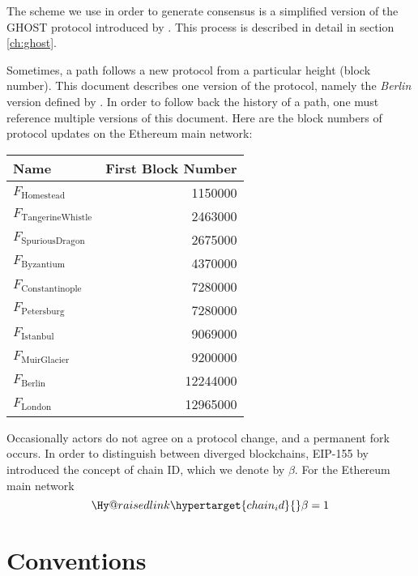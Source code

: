 \documentclass[9pt,oneside]{amsart}
\makeatletter
\newcommand{\linkdest}[1]{\Hy@raisedlink{\hypertarget{#1}{}}}
\makeatother
\begin{document}
\begin{multicols}{2}
The scheme we use in order to generate consensus is a simplified version of the GHOST protocol introduced by \cite{cryptoeprint:2013:881}. This process is described in detail in section \ref{ch:ghost}.

Sometimes, a path follows a new protocol from a particular height (block number).
This document describes one version of the protocol, namely the \textit{Berlin} version defined by \cite{BeikoBerlin}.
In order to follow back the history of a path, one must reference multiple versions of this document.
Here are the block numbers of protocol updates on the Ethereum main network:
\par
\begin{center}
\begin{tabular}{lr}
\toprule
Name & First Block Number \\
\midrule
$F_{\mathrm{Homestead}}$         &  1150000 \\
$F_{\mathrm{Tangerine Whistle}}$ &  2463000 \\
$F_{\mathrm{Spurious Dragon}}$   &  2675000 \\
$F_{\mathrm{Byzantium}}$         &  4370000 \\
$F_{\mathrm{Constantinople}}$    &  7280000 \\
$F_{\mathrm{Petersburg}}$        &  7280000 \\
$F_{\mathrm{Istanbul}}$          &  9069000 \\
$F_{\mathrm{Muir Glacier}}$      &  9200000 \\
$F_{\mathrm{Berlin}}$            & 12244000 \\
$F_{\mathrm{London}}$            & 12965000 \\
\bottomrule
\end{tabular}
\end{center}
\par

Occasionally actors do not agree on a protocol change, and a permanent fork occurs.
In order to distinguish between diverged blockchains, EIP-155 by \cite{EIP-155} introduced the concept of chain ID, which we denote by $\beta$.
For the Ethereum main network
\begin{equation}
  \linkdest{chain_id}
  \beta = 1
\end{equation}

\section{Conventions}\label{ch:conventions}


\end{multicols}
\end{document}
